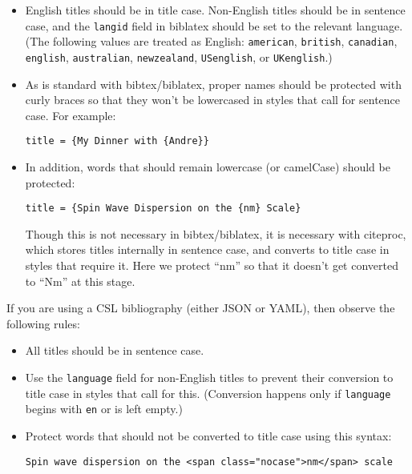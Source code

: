 \begin{itemize}
\item
  English titles should be in title case. Non-English titles should be
  in sentence case, and the \texttt{langid} field in biblatex should be
  set to the relevant language. (The following values are treated as
  English: \texttt{american}, \texttt{british}, \texttt{canadian},
  \texttt{english}, \texttt{australian}, \texttt{newzealand},
  \texttt{USenglish}, or \texttt{UKenglish}.)
\item
  As is standard with bibtex/biblatex, proper names should be protected
  with curly braces so that they won't be lowercased in styles that call
  for sentence case. For example:

\begin{verbatim}
title = {My Dinner with {Andre}}
\end{verbatim}
\item
  In addition, words that should remain lowercase (or camelCase) should
  be protected:

\begin{verbatim}
title = {Spin Wave Dispersion on the {nm} Scale}
\end{verbatim}

  Though this is not necessary in bibtex/biblatex, it is necessary with
  citeproc, which stores titles internally in sentence case, and
  converts to title case in styles that require it. Here we protect
  ``nm'' so that it doesn't get converted to ``Nm'' at this stage.
\end{itemize}

If you are using a CSL bibliography (either JSON or YAML), then observe
the following rules:

\begin{itemize}
\item
  All titles should be in sentence case.
\item
  Use the \texttt{language} field for non-English titles to prevent
  their conversion to title case in styles that call for this.
  (Conversion happens only if \texttt{language} begins with \texttt{en}
  or is left empty.)
\item
  Protect words that should not be converted to title case using this
  syntax:

\begin{verbatim}
Spin wave dispersion on the <span class="nocase">nm</span> scale
\end{verbatim}
\end{itemize}

